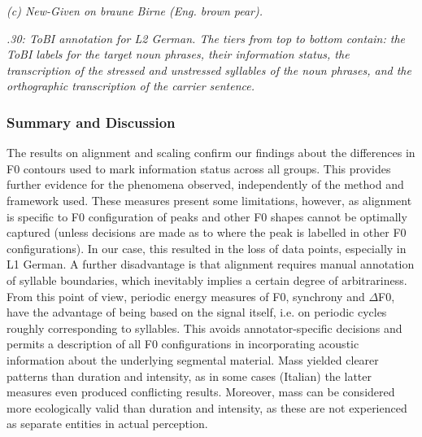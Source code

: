   
 

\textit{(c) New-Given on braune Birne (Eng. brown pear).}

\begin{stylelsTable}
\textit{.30: ToBI annotation for L2 German. The tiers from top to bottom contain: the ToBI labels for the target noun phrases, their information status, the transcription of the stressed and unstressed syllables of the noun phrases, and the orthographic transcription of the carrier sentence.}
\end{stylelsTable}

\subsubsection{}
\subsubsection{Summary and Discussion}
\hypertarget{Toc191305921}{}
The results on alignment and scaling confirm our findings about the differences in F0 contours used to mark information status across all groups. This provides further evidence for the phenomena observed, independently of the method and framework used. These measures present some limitations, however, as alignment is specific to F0 configuration of peaks and other F0 shapes cannot be optimally captured (unless decisions are made as to where the peak is labelled in other F0 configurations). In our case, this resulted in the loss of data points, especially in L1 German. A further disadvantage is that alignment requires manual annotation of syllable boundaries, which inevitably implies a certain degree of arbitrariness. From this point of view, periodic energy measures of F0, synchrony and ${\Delta}$F0, have the advantage of being based on the signal itself, i.e. on periodic cycles roughly corresponding to syllables. This avoids annotator-specific decisions and permits a description of all F0 configurations in incorporating acoustic information about the underlying segmental material. Mass yielded clearer patterns than duration and intensity, as in some cases (Italian) the latter measures even produced conflicting results. Moreover, mass can be considered more ecologically valid than duration and intensity, as these are not experienced as separate entities in actual perception.

